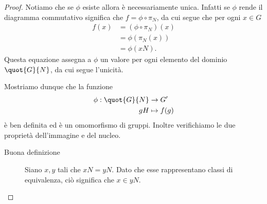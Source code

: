 \begin{proof}
    Notiamo che se $\phi$ esiste allora è necessariamente unica. Infatti se $\phi$ rende il diagramma commutativo significa che $f = \phi \circ \pi_N$, da cui segue che per ogni $x \in G$ \begin{align*}
        f(x) &= (\phi \circ \pi_N)(x) \\
        &= \phi(\pi_N(x))\\
        &= \phi(xN).
    \end{align*}
    Questa equazione assegna a $\phi$ un valore per ogni elemento del dominio $\quot{G}{N}$, da cui segue l'unicità.

    Mostriamo dunque che la funzione \begin{align*}
        \phi : \quot{G}{N} &\to G^\prime \\
        gH &\mapsto f(g)
    \end{align*} è ben definita ed è un omomorfismo di gruppi. Inoltre verifichiamo le due proprietà dell'immagine e del nucleo.
    \begin{description}
        \item[Buona definizione] Siano $x, y$ tali che $xN = yN$. Dato che esse rappresentano classi di equivalenza, ciò significa che $x \in yN$. 
        

\end{description}
\end{proof}
